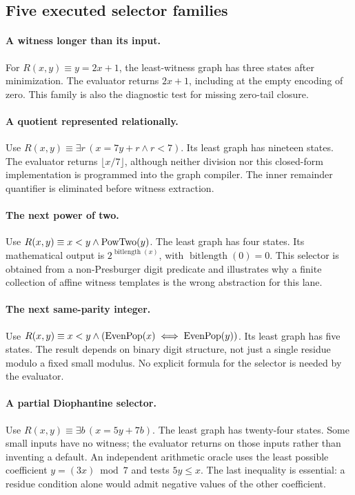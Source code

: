 \subsection{Five executed selector families}
\paragraph{A witness longer than its input.}
For \(R(x,y)\equiv y=2x+1\), the least-witness graph has three states after minimization. The evaluator returns \(2x+1\), including at the empty encoding of zero. This family is also the diagnostic test for missing zero-tail closure.

\paragraph{A quotient represented relationally.}
Use \(R(x,y)\equiv\exists r\,(x=7y+r\land r<7)\). Its least graph has nineteen states. The evaluator returns \(\lfloor x/7\rfloor\), although neither division nor this closed-form implementation is programmed into the graph compiler. The inner remainder quantifier is eliminated before witness extraction.

\paragraph{The next power of two.}
Use \(R(x,y)\equiv x<y\land\operatorname{PowTwo}(y)\). The least graph has four states. Its mathematical output is \(2^{\operatorname{bitlength}(x)}\), with \(\operatorname{bitlength}(0)=0\). This selector is obtained from a non-Presburger digit predicate and illustrates why a finite collection of affine witness templates is the wrong abstraction for this lane.

\paragraph{The next same-parity integer.}
Use \(R(x,y)\equiv x<y\land(\operatorname{EvenPop}(x)\iff\operatorname{EvenPop}(y))\). Its least graph has five states. The result depends on binary digit structure, not just a single residue modulo a fixed small modulus. No explicit formula for the selector is needed by the evaluator.

\paragraph{A partial Diophantine selector.}
Use \(R(x,y)\equiv\exists b\,(x=5y+7b)\). The least graph has twenty-four states. Some small inputs have no witness; the evaluator returns  on those inputs rather than inventing a default. An independent arithmetic oracle uses the least possible coefficient \(y=(3x)\bmod7\) and tests \(5y\le x\). The last inequality is essential: a residue condition alone would admit negative values of the other coefficient.


